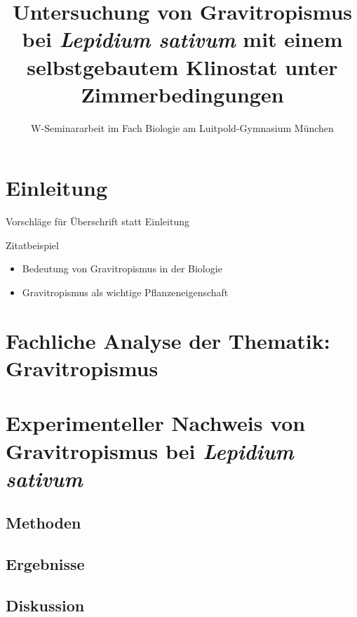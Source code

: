 \documentclass[
a4paper, 
11pt, 
ngerman,
listof=totoc,
bibliography=totocnumbered
]{scrreprt}
\title{Untersuchung von Gravitropismus bei \emph{Lepidium sativum} mit einem selbstgebautem Klinostat unter Zimmerbedingungen}
\subtitle{W-Seminararbeit im Fach Biologie am Luitpold-Gymnasium München}
\begin{document}
\maketitle
\tableofcontents

\chapter{Einleitung}

Vorschläge für Überschrift statt {\glqq Einleitung\grqq} 

Zitatbeispiel \parencite[29]{campbell}

\begin{itemize}
	\item Bedeutung von Gravitropismus in der Biologie
	\item Gravitropismus als wichtige Pflanzeneigenschaft 
\end{itemize}

\chapter{Fachliche Analyse der Thematik: Gravitropismus}

\chapter{Experimenteller Nachweis von Gravitropismus bei \emph{Lepidium sativum}}

\section{Methoden}

\section{Ergebnisse}

\section{Diskussion}


\printbibliography
\end{document}
